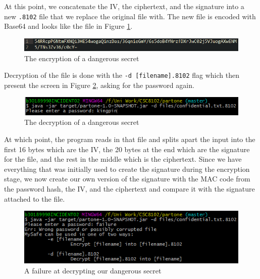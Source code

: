 \documentclass[10pt,journal,compsoc]{IEEEtran}
\begin{document}
At this point, we concatenate the IV, the ciphertext, and the signature into a
new \texttt{.8102} file that we replace the original file with. The new file is
encoded with Base64 and looks like the file in Figure
\ref{fig:secretencryption}.

\begin{figure}[h!]
	\centering
	\includegraphics[width=0.9\linewidth]{images/secret_encryption}
	\caption{The encryption of a dangerous secret}
	\label{fig:secretencryption}
\end{figure}

Decryption of the file is done with the \texttt{-d [filename].8102} flag which
then present the screen in Figure \ref{fig:secretdecryption}, asking for the
password again.

\begin{figure}[h!]
	\centering
	\includegraphics[width=0.9\linewidth]{images/secret_decryption}
	\caption{The decryption of a dangerous secret}
	\label{fig:secretdecryption}
\end{figure}

At which point, the program reads in that file and splits apart the input into
the first 16 bytes which are the IV, the 20 bytes at the end which are the
signature for the file, and the rest in the middle which is the ciphertext.
Since we have everything that was initially used to create the signature during
the encryption stage, we now create our own version of the signature with the
MAC code from the password hash, the IV, and the ciphertext and compare it with
the signature attached to the file.

\begin{figure}[h!]
	\centering
	\includegraphics[width=0.9\linewidth]{images/secret_failure}
	\caption{A failure at decrypting our dangerous secret}
	\label{fig:secretfailure}
\end{figure}
\end{document}
